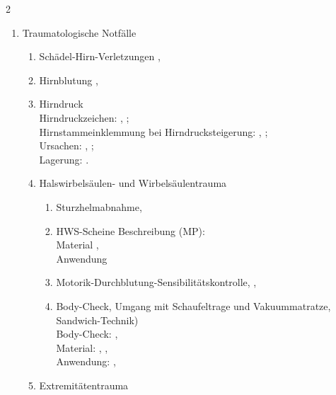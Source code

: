 \begin{WidePar}
\begin{multicols}{2}
  \begin{enumerate}
    \item Traumatologische Notfälle
    \begin{enumerate}
      \item      Schädel-Hirn-Verletzungen \dotfill  {}, 
      \item      Hirnblutung \dotfill {},
      \item      Hirndruck
      \\
      Hirndruckzeichen:  \dotfill {},
      ;
      \\
      Hirnstammeinklemmung bei
      Hirndrucksteigerung:  \dotfill {},
      ;
      \\
      Ursachen: \dotfill
      , ;
      \\
      Lagerung:  \dotfill {}.
      \item
      Halswirbelsäulen- und  Wirbelsäulentrauma
      \begin{enumerate}
        \item      Sturzhelmabnahme, \dotfill {}
        \item      HWS-Scheine Beschreibung (MP):
        \\
        Material  \dotfill {}, \\
        Anwendung  \dotfill {}
        \item
        Motorik-Durchblutung-Sensibilitätskontrolle, \dotfill 	{},
       \item      Body-Check, Umgang mit  Schaufeltrage und
       Vakuummatratze, Sandwich-Technik)\\
       Body-Check:  \dotfill {}, \\
       Material: \dotfill
       ,
       ,
       \\ Anwendung: \dotfill
       ,
      \end{enumerate}
      
      \item Extremitätentrauma
      \begin{enumerate}
        

\end{enumerate}
\end{enumerate}
\end{enumerate}
\end{multicols}
\end{WidePar}
